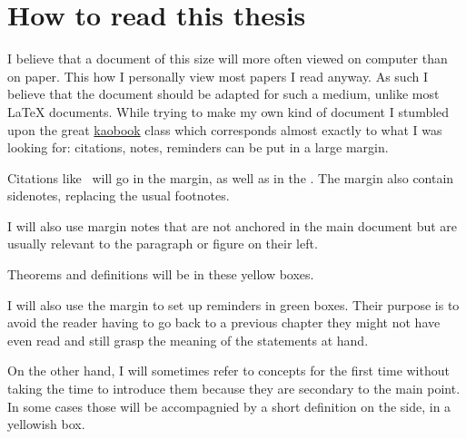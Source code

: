 \chapter{How to read this thesis}

I believe that a document of this size will more often viewed on computer than
on paper. This how I personally view most papers I read anyway.
As such I believe that the document should be adapted for such a medium, unlike
most \LaTeX{} documents.
While trying to make my own kind of document I stumbled upon the great
\href{https://github.com/fmarotta/kaobook/}{kaobook} class which corresponds
almost exactly to what I was looking for: citations, notes, reminders can be put
in a large margin.

Citations like~ will go in the
margin, as well as in the .
The margin also contain sidenotes, replacing the usual footnotes.

I will also use margin notes that are not anchored in the main document but are
usually relevant to the paragraph or figure on their left.

\begin{theorem}
  Theorems and definitions will be in these yellow boxes.
\end{theorem}

I will also use the margin to set up reminders in green boxes. Their purpose
is to avoid the reader having to go back to a previous chapter they might not
have even read and still grasp the meaning of the statements at hand.

On the other hand, I will sometimes refer to concepts for the first time without
taking the time to introduce them because they are secondary to the main point.
In some cases those will be accompagnied by a short definition on the side, in
a yellowish box.